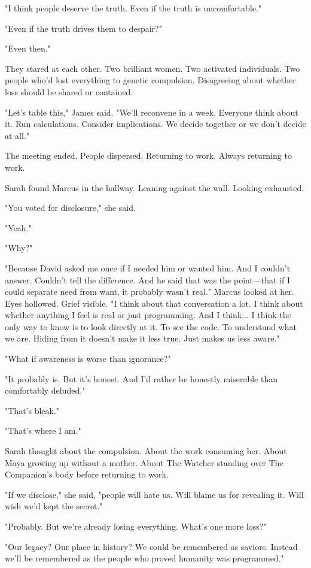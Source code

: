 "I think people deserve the truth. Even if the truth is uncomfortable."

"Even if the truth drives them to despair?"

"Even then."

They stared at each other. Two brilliant women. Two activated individuals. Two people who'd lost everything to genetic compulsion. Disagreeing about whether loss should be shared or contained.

"Let's table this," James said. "We'll reconvene in a week. Everyone think about it. Run calculations. Consider implications. We decide together or we don't decide at all."

The meeting ended. People dispersed. Returning to work. Always returning to work.

Sarah found Marcus in the hallway. Leaning against the wall. Looking exhausted.

"You voted for disclosure," she said.

"Yeah."

"Why?"

"Because David asked me once if I needed him or wanted him. And I couldn't answer. Couldn't tell the difference. And he said that was the point—that if I could separate need from want, it probably wasn't real." Marcus looked at her. Eyes hollowed. Grief visible. "I think about that conversation a lot. I think about whether anything I feel is real or just programming. And I think... I think the only way to know is to look directly at it. To see the code. To understand what we are. Hiding from it doesn't make it less true. Just makes us less aware."

"What if awareness is worse than ignorance?"

"It probably is. But it's honest. And I'd rather be honestly miserable than comfortably deluded."

"That's bleak."

"That's where I am."

Sarah thought about the compulsion. About the work consuming her. About Maya growing up without a mother. About The Watcher standing over The Companion's body before returning to work.

"If we disclose," she said, "people will hate us. Will blame us for revealing it. Will wish we'd kept the secret."

"Probably. But we're already losing everything. What's one more loss?"

"Our legacy? Our place in history? We could be remembered as saviors. Instead we'll be remembered as the people who proved humanity was programmed."

